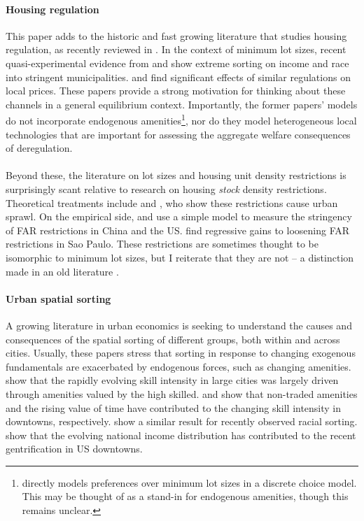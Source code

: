 \paragraph*{Housing regulation} This paper adds to the historic and fast growing literature that studies housing regulation, as recently reviewed in \cite{gyourkomolloy}. In the context of minimum lot sizes, recent quasi-experimental evidence from \cite{Song} and \cite{kulka} show extreme sorting on income and race into stringent municipalities. \cite{KSC} and \cite{zabel} find significant effects of similar regulations on local prices. These papers provide a strong motivation for thinking about these channels in a general equilibrium context. Importantly, the former papers' models do not incorporate endogenous amenities\footnote{\cite{Song} directly models preferences over minimum lot sizes in a discrete choice model. This may be thought of as a stand-in for endogenous amenities, though this remains unclear.}, nor do they model heterogeneous local technologies that are important for assessing the aggregate welfare consequences of deregulation.
\paragraph*{}
Beyond these, the literature on lot sizes and housing unit density restrictions is surprisingly scant relative to research on housing \textit{stock} density restrictions. Theoretical treatments include \cite{bbheight} and \cite{mills2005}, who show these restrictions cause urban sprawl. On the empirical side, \cite{BruecknerFuGu} and \cite{bruecknersingh} use a simple model to measure the stringency of FAR restrictions in China and the US. \cite{anagoletal2021} find regressive gains to loosening FAR restrictions in Sao Paulo. These restrictions are sometimes thought to be isomorphic to minimum lot sizes, but I reiterate that they are not --  a distinction made in an old literature \citep{griesonwhite}.


\paragraph*{Urban spatial sorting} A growing literature in urban economics is seeking to understand the causes and consequences of the spatial sorting of different groups, both within and across cities. Usually, these papers stress that sorting in response to changing exogenous fundamentals are exacerbated by endogenous forces, such as changing amenities. \cite{diamond2016} show that the rapidly evolving skill intensity in large cities was largely driven through amenities valued by the high skilled. \cite{couturehandbury} and \cite{su2021} show that non-traded amenities and the rising value of time have contributed to the changing skill intensity in downtowns, respectively. \cite{bshartley2020} show a similar result for recently observed racial sorting. \cite{Coutureetal} show that the evolving national income distribution has contributed to the recent gentrification in US downtowns.

